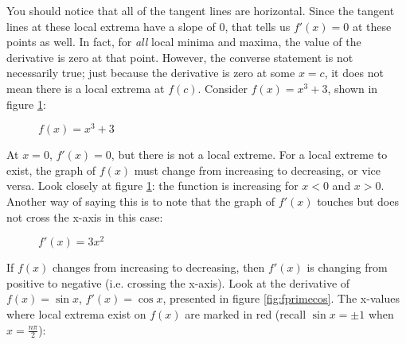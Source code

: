 
You should notice that all of the tangent lines are horizontal. Since the 
tangent lines at these local extrema have a slope of $0$, that tells us $f'(x) 
= 0$ at these points as well. In fact, for \textit{all} local minima and maxima, 
the value of the derivative is zero at that point. However, the converse 
statement is not necessarily true; just because the derivative is zero at 
some $x = c$, it does not mean there is a local extrema at $f(c)$. Consider 
$f(x) = x^3+3$, shown in figure  \ref{fig:nonextrema}:

\begin{figure}
	\centering
	\caption{$f(x) = x^3+3$}
	\label{fig:nonextrema}
\end{figure}


At $x=0$, $f'(x)=0$, but there is not a local extreme. For a local extreme to 
exist, the graph of $f(x)$ must change from increasing to decreasing, or vice 
versa. Look closely at figure \ref{fig:nonextrema}: the function is increasing 
for $x<0$ and $x>0$. Another way of saying this is to note that the graph of 
$f'(x)$ touches but does not cross the x-axis in this case:

\begin{figure}
	\centering
	\caption{$f'(x) = 3x^2$}
	\label{fig:touch}
\end{figure}


If $f(x)$ changes from increasing to decreasing, then $f'(x)$ is changing from 
positive to negative (i.e. crossing the x-axis). Look at the derivative of 
$f(x) = \sin{x}$, $f'(x)=\cos{x}$, presented in figure \ref{fig:fprimecos}. 
The x-values where local extrema exist on $f(x)$ are marked in red (recall 
$\sin{x} = \pm 1$ when $x=\frac{n\pi}{2}$):

